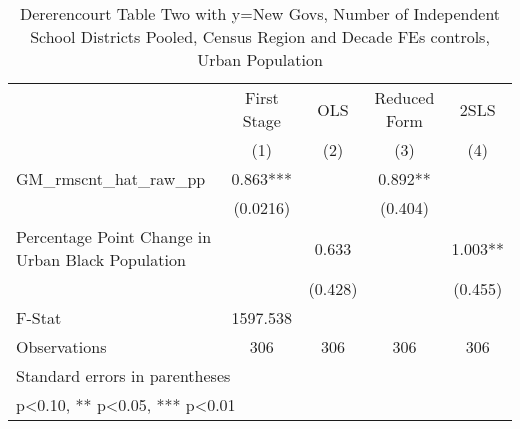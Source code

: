 \begin{table}[htbp]\centering
\def\sym#1{\ifmmode^{#1}\else\(^{#1}\)\fi}
\caption{Dererencourt Table Two with y=New Govs, Number of Independent School Districts  Pooled, Census Region and Decade FEs controls, Urban Population}
\begin{tabular}{l*{4}{c}}
\toprule
                    & First Stage   &         OLS   &Reduced Form   &        2SLS   \\
                    &\multicolumn{1}{c}{(1)}   &\multicolumn{1}{c}{(2)}   &\multicolumn{1}{c}{(3)}   &\multicolumn{1}{c}{(4)}   \\
\midrule
GM\_rmscnt\_hat\_raw\_pp&       0.863***&               &       0.892** &               \\
                    &    (0.0216)   &               &     (0.404)   &               \\
\addlinespace
Percentage Point Change in Urban Black Population&               &       0.633   &               &       1.003** \\
                    &               &     (0.428)   &               &     (0.455)   \\
\midrule
F-Stat              &    1597.538   &               &               &               \\
Observations        &         306   &         306   &         306   &         306   \\
\bottomrule
\multicolumn{5}{l}{\footnotesize Standard errors in parentheses}\\
\multicolumn{5}{l}{\footnotesize * p<0.10, ** p<0.05, *** p<0.01}\\
\end{tabular}
\end{table}
